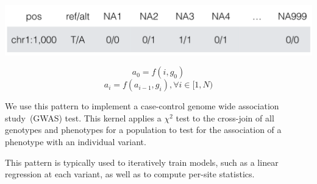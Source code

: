\documentclass[11pt]{a0poster}
\begin{document}
{\begin{minipage}[t][2045pt][t]{\linewidth}
\begin{minipage}{0.6\linewidth}
{\begin{minipage}[t][1170pt][t]{\linewidth}
\begin{minipage}{0.48\linewidth}
\vspace{20pt}

\begin{center}
\includegraphics[width=0.95\linewidth]{aggregation.pdf}

\vspace{-40pt}

$$
a_0 = f(i, g_0)
$$
$$
a_i = f(a_{i-1}, g_i), \forall i \in [1, N)
$$

\end{center}

\vspace{40pt}

We use this pattern to implement a case-control genome wide association
study~(GWAS) test. This kernel applies a $\chi^2$ test to the cross-join of
all genotypes and phenotypes for a population to test for the association of
a phenotype with an individual variant.

\vspace{20pt}

This pattern is typically used to iteratively train models, such as a linear
regression at each variant, as well as to compute per-site statistics.
\end{minipage}
\pagebreak
\end{minipage}
}


\end{minipage}
\end{minipage}}
\end{document}
